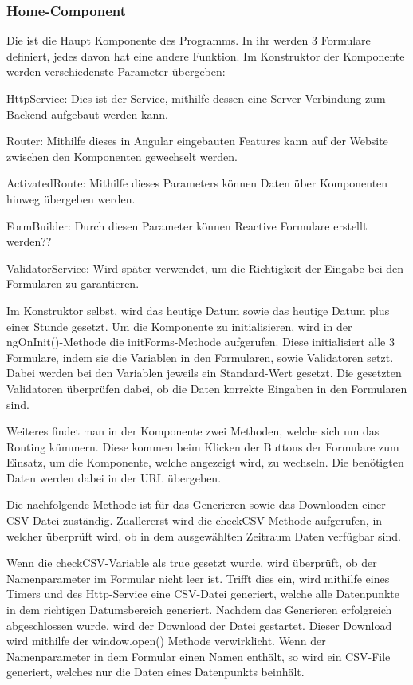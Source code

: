 \subsubsection{Home-Component}
Die ist die Haupt Komponente des Programms. In ihr werden 3 Formulare definiert, jedes davon hat eine andere Funktion. Im Konstruktor der Komponente werden verschiedenste Parameter übergeben:

\begin{compactitem}
    \item HttpService: Dies ist der Service, mithilfe dessen eine Server-Verbindung zum Backend aufgebaut werden kann.    
    \item Router: Mithilfe dieses in Angular eingebauten Features kann auf der Website zwischen den Komponenten gewechselt werden.        
    \item ActivatedRoute: Mithilfe dieses Parameters können Daten über Komponenten hinweg übergeben werden.    
    \item FormBuilder: Durch diesen Parameter können Reactive Formulare erstellt werden??
    \item ValidatorService: Wird später verwendet, um die Richtigkeit der Eingabe bei den Formularen zu garantieren.
\end{compactitem}

Im Konstruktor selbst, wird das heutige Datum sowie das heutige Datum plus einer Stunde gesetzt.
Um die Komponente zu initialisieren, wird in der ngOnInit()-Methode die initForms-Methode aufgerufen. Diese initialisiert alle 3 Formulare, indem sie die Variablen in den Formularen, sowie Validatoren setzt. Dabei werden bei den Variablen jeweils ein Standard-Wert gesetzt. Die gesetzten Validatoren überprüfen dabei, ob die Daten korrekte Eingaben in den Formularen sind. 

Weiteres findet man in der Komponente zwei Methoden, welche sich um das Routing kümmern. Diese kommen beim Klicken der Buttons der Formulare zum Einsatz, um die Komponente, welche angezeigt wird, zu wechseln. Die benötigten Daten werden dabei in der URL übergeben.

Die nachfolgende Methode ist für das Generieren sowie das Downloaden einer CSV-Datei zuständig. Zuallererst wird die checkCSV-Methode aufgerufen, in welcher überprüft wird, ob in dem ausgewählten Zeitraum Daten verfügbar sind.

Wenn die checkCSV-Variable als true gesetzt wurde, wird überprüft, ob der Namenparameter im Formular nicht leer ist. Trifft dies ein, wird mithilfe eines Timers und des Http-Service eine CSV-Datei generiert, welche alle Datenpunkte in dem richtigen Datumsbereich generiert. Nachdem das Generieren erfolgreich abgeschlossen wurde, wird der Download der Datei gestartet. Dieser Download wird mithilfe der window.open() Methode verwirklicht. Wenn der Namenparameter in dem Formular einen Namen enthält, so wird ein CSV-File generiert, welches nur die Daten eines Datenpunkts beinhält.

